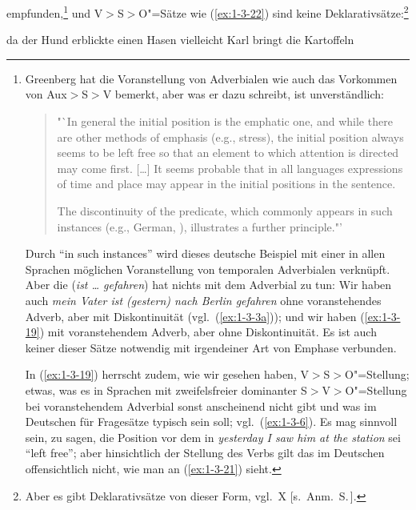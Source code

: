 \documentclass[output=paper]{langsci/langscibook}
\begin{document}
empfunden,\footnote{\label{fn:1-11}%
  Greenberg hat die Voranstellung von Adverbialen
  wie auch das Vorkommen von Aux$>$S$>$V bemerkt, aber was er dazu
  schreibt, ist unverständlich:
  \begin{quote}
    "`In general the initial position is the emphatic one, and while there are other methods of emphasis
    (e.g., stress), the initial position always seems to be left free so that an element to which attention is
    directed may come first. [\ldots] It seems probable that in all languages expressions of time and place
    may appear in the initial positions in the sentence.
    
    \hspace{1em} The discontinuity of the predicate, which commonly appears in such instances (e.g., German,
    ), illustrates a further principle."' \citep[103f]{Greenberg1963}
  \end{quote}
  Durch "`in such instances"' wird dieses deutsche Beispiel mit einer in allen Sprachen möglichen
  Voranstellung von temporalen Adverbialen verknüpft. Aber die 
  (\textit{ist \ldots{} gefahren}) hat nichts mit dem Adverbial zu tun: Wir haben auch \textit{mein
    Vater ist (gestern) nach Berlin gefahren} ohne voranstehendes Adverb, aber mit Diskontinuität
  (vgl.\ (\ref{ex:1-3-3a})); und wir haben (\ref{ex:1-3-19}) mit voranstehendem Adverb, aber ohne
  Diskontinuität. Es ist auch keiner dieser Sätze notwendig mit irgendeiner Art von Emphase verbunden.

  In (\ref{ex:1-3-19}) herrscht zudem, wie wir gesehen haben, V$>$S$>$O"=Stellung; etwas, was es in
  Sprachen mit zweifelsfreier dominanter S$>$V$>$O"=Stellung bei voranstehendem Adverbial sonst
  anscheinend nicht gibt und was im Deutschen für Fragesätze typisch sein soll;
  vgl.\ (\ref{ex:1-3-6}). Es mag sinnvoll sein, zu sagen, die Position vor dem  in
  \textit{yesterday I saw him at the station} sei "`left free"'; aber hinsichtlich der Stellung des
  Verbs gilt das im Deutschen offensichtlich nicht, wie man an (\ref{ex:1-3-21}) sieht.%
} und
V$>$S$>$O"=Sätze wie (\ref{ex:1-3-22}) sind keine Deklarativsätze:\footnote{\label{fn:1-12}%
  Aber es gibt Deklarativsätze von dieser Form, vgl.\ X [s.\ Anm.\ S.\,\pageref{fn-herausgeber-topo}].%
}
\begin{exe}
\ex\label{ex:1-3-21}
\begin{xlist}
\ex\label{ex:1-3-21a} da der Hund erblickte einen Hasen
\ex\label{ex:1-3-21b} vielleicht Karl bringt die Kartoffeln
\end{xlist}
\end{exe}
\end{document}
